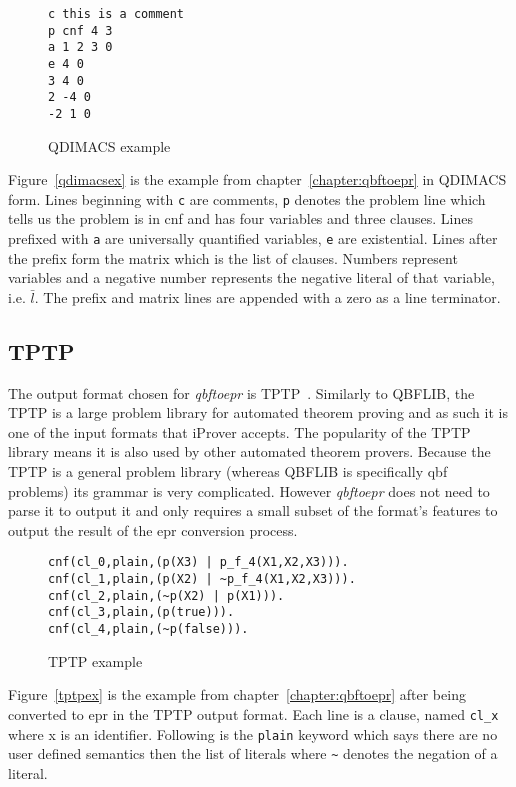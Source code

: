 \begin{figure}[h]
\caption{QDIMACS example}
\begin{CenteredBox}
\begin{lstlisting}[label=qdimacsex]
c this is a comment
p cnf 4 3
a 1 2 3 0
e 4 0
3 4 0
2 -4 0
-2 1 0
\end{lstlisting}
\end{CenteredBox}
\end{figure}
Figure~\ref{qdimacsex} is the example from chapter~\ref{chapter:qbftoepr} in QDIMACS form. Lines beginning with \texttt{c} are comments, \texttt{p} denotes the problem line which tells us the problem is in \gls{cnf} and has four variables and three clauses. Lines prefixed with \texttt{a} are universally quantified variables, \texttt{e} are existential. Lines after the prefix form the matrix which is the list of clauses. Numbers represent variables and a negative number represents the negative literal of that variable, i.e. $\bar{l}$. The prefix and matrix lines are appended with a zero as a line terminator.

\subsection{TPTP}
The output format chosen for \textit{qbftoepr} is TPTP~\cite{tptp}. Similarly to QBFLIB, the TPTP is a large problem library for automated theorem proving and as such it is one of the input formats that iProver accepts. The popularity of the TPTP library means it is also used by other automated theorem provers. Because the TPTP is a general problem library (whereas QBFLIB is specifically \gls{qbf} problems) its grammar is very complicated. However \textit{qbftoepr} does not need to parse it to output it and only requires a small subset of the format's features to output the result of the \gls{epr} conversion process.

\begin{figure}[h]
\caption{TPTP example}
\begin{CenteredBox}
\begin{lstlisting}[label=tptpex]
cnf(cl_0,plain,(p(X3) | p_f_4(X1,X2,X3))).
cnf(cl_1,plain,(p(X2) | ~p_f_4(X1,X2,X3))).
cnf(cl_2,plain,(~p(X2) | p(X1))).
cnf(cl_3,plain,(p(true))).
cnf(cl_4,plain,(~p(false))).
\end{lstlisting}
\end{CenteredBox}
\end{figure}
Figure~\ref{tptpex} is the example from chapter~\ref{chapter:qbftoepr} after being converted to \gls{epr} in the TPTP output format. Each line is a clause, named \texttt{cl\_x} where x is an identifier. Following is the \texttt{plain} keyword which says there are no user defined semantics then the list of literals where \texttt{\textasciitilde} denotes the negation of a literal.

